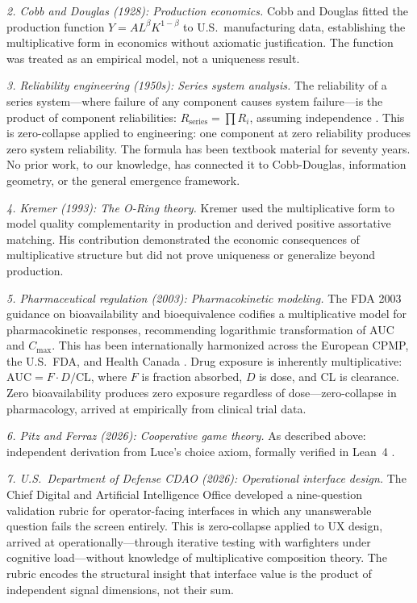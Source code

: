 \documentclass[12pt, a4paper]{article}
\theoremstyle{definition}
\theoremstyle{remark}
\begin{document}
\textit{2. Cobb and Douglas (1928): Production economics.} Cobb and Douglas \cite{cobb1928} fitted the production function $Y = A L^\beta K^{1-\beta}$ to U.S.\ manufacturing data, establishing the multiplicative form in economics without axiomatic justification. The function was treated as an empirical model, not a uniqueness result.

\textit{3. Reliability engineering (1950s): Series system analysis.} The reliability of a series system---where failure of any component causes system failure---is the product of component reliabilities: $R_{\text{series}} = \prod R_i$, assuming independence \cite{agree1957}. This is zero-collapse applied to engineering: one component at zero reliability produces zero system reliability. The formula has been textbook material for seventy years. No prior work, to our knowledge, has connected it to Cobb-Douglas, information geometry, or the general emergence framework.

\textit{4. Kremer (1993): The O-Ring theory.} Kremer \cite{kremer1993} used the multiplicative form to model quality complementarity in production and derived positive assortative matching. His contribution demonstrated the economic consequences of multiplicative structure but did not prove uniqueness or generalize beyond production.

\textit{5. Pharmaceutical regulation (2003): Pharmacokinetic modeling.} The FDA 2003 guidance on bioavailability and bioequivalence \cite{fda2003} codifies a multiplicative model for pharmacokinetic responses, recommending logarithmic transformation of AUC and $C_{\max}$. This has been internationally harmonized across the European CPMP, the U.S.\ FDA, and Health Canada \cite{steinijans1993}. Drug exposure is inherently multiplicative: $\text{AUC} = F \cdot D / \text{CL}$, where $F$ is fraction absorbed, $D$ is dose, and CL is clearance. Zero bioavailability produces zero exposure regardless of dose---zero-collapse in pharmacology, arrived at empirically from clinical trial data.

\textit{6. Pitz and Ferraz (2026): Cooperative game theory.} As described above: independent derivation from Luce's choice axiom, formally verified in Lean~4 \cite{pitz2026}.

\textit{7. U.S.\ Department of Defense CDAO (2026): Operational interface design.} The Chief Digital and Artificial Intelligence Office developed a nine-question validation rubric for operator-facing interfaces in which any unanswerable question fails the screen entirely. This is zero-collapse applied to UX design, arrived at operationally---through iterative testing with warfighters under cognitive load---without knowledge of multiplicative composition theory. The rubric encodes the structural insight that interface value is the product of independent signal dimensions, not their sum.
\end{document}
